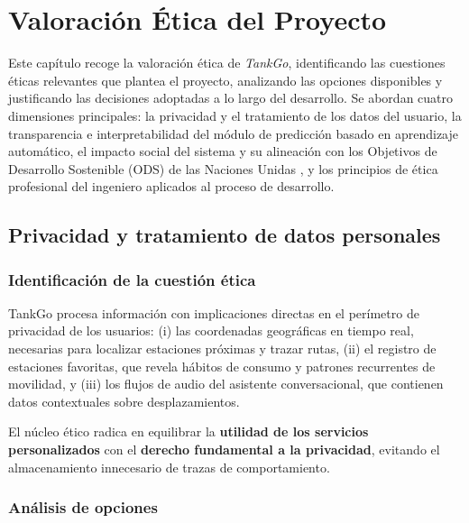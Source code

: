 
\chapter{Valoración Ética del Proyecto}
\label{ch:etica}

Este capítulo recoge la valoración ética de \textit{TankGo}, identificando las cuestiones
éticas relevantes que plantea el proyecto, analizando las opciones disponibles y justificando
las decisiones adoptadas a lo largo del desarrollo. Se abordan cuatro dimensiones principales:
la privacidad y el tratamiento de los datos del usuario, la transparencia e interpretabilidad
del módulo de predicción basado en aprendizaje automático, el impacto social del sistema y
su alineación con los Objetivos de Desarrollo Sostenible (ODS) de las Naciones Unidas
\cite{onu_ods_goals}, y los principios de ética profesional del ingeniero aplicados
al proceso de desarrollo.

\section{Privacidad y tratamiento de datos personales}
\label{sec:etica-privacidad}

\subsection{Identificación de la cuestión ética}

TankGo procesa información con implicaciones directas en el perímetro de privacidad de los usuarios: 
(i) las coordenadas geográficas en tiempo real, necesarias para localizar estaciones próximas y trazar rutas, 
(ii) el registro de estaciones favoritas, que revela hábitos de consumo y patrones recurrentes de movilidad, y 
(iii) los flujos de audio del asistente conversacional, que contienen datos contextuales sobre desplazamientos. 

El núcleo ético radica en equilibrar la \textbf{utilidad de los servicios personalizados} 
con el \textbf{derecho fundamental a la privacidad}, evitando el almacenamiento innecesario de trazas de comportamiento.

\subsection{Análisis de opciones}

